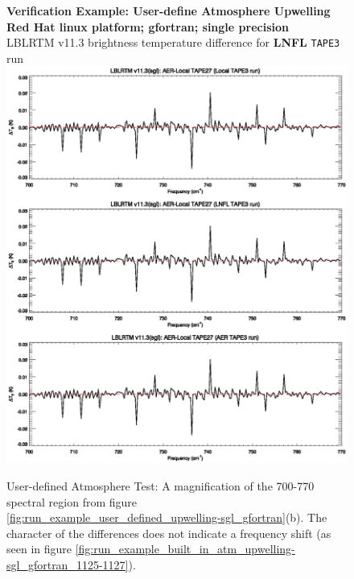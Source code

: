 \begin{figure}[htp]
  \centering
  \qquad\sffamily\textbf{Verification Example: User-define Atmosphere Upwelling}\\
  \qquad\sffamily\textbf{Red Hat linux platform; gfortran; single precision}\\
  \qquad\textsf{LBLRTM v11.3 brightness temperature difference for \textbf{LNFL} \texttt{TAPE3} run}\\
  \includegraphics[bb=82 313 534 472,clip,scale=1.0]{graphics/run_example_user_defined_upwelling/gfortran/sgl_700-770.eps}
  \caption{User-defined Atmosphere Test: A magnification of the 700-770\invcm{} spectral region from figure \ref{fig:run_example_user_defined_upwelling-sgl_gfortran}(b). The character of the differences does not indicate a frequency shift (as seen in figure \ref{fig:run_example_built_in_atm_upwelling-sgl_gfortran_1125-1127}).}
  \label{fig:run_example_user_defined_upwelling-sgl_700-770}
\end{figure}

